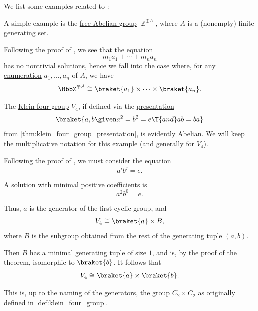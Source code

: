 \begin{example}\label{ex:thm:fundamental_theorem_of_finitely_generated_abelian_groups}
  We list some examples related to :
  \begin{thmenum}
     A simple example is the \hyperref[def:free_abelian_group]{free Abelian group} \( \BbbZ^{\oplus A} \), where \( A \) is a (nonempty) finite generating set.

    Following the proof of , we see that the equation
    \begin{equation*}
      m_1 a_1 + \cdots + m_n a_n
    \end{equation*}
    has no nontrivial solutions, hence we fall into the case where, for any \hyperref[def:set_enumeration]{enumeration} \( a_1, \ldots, a_n \) of \( A \), we have
    \begin{equation*}
      \BbbZ^{\oplus A} \cong \braket{ a_1 } \times \cdots \times \braket{ a_n }.
    \end{equation*}

     The \hyperref[def:klein_four_group]{Klein four group} \( V_4 \), if defined via the \hyperref[def:group_presentation]{presentation}
    \begin{equation*}
      \braket{ a, b \given a^2 = b^2 = e \T{and} ab = ba }
    \end{equation*}
    from \cref{thm:klein_four_group_presentation}, is evidently Abelian. We will keep the multiplicative notation for this example (and generally for \( V_4 \)).

    Following the proof of , we must consider the equation
    \begin{equation*}
      a^i b^j = e.
    \end{equation*}

    A solution with minimal positive coefficients is
    \begin{equation*}
      a^2 b^0 = e.
    \end{equation*}

    Thus, \( a \) is the generator of the first cyclic group, and
    \begin{equation*}
      V_4 \cong \braket{ a } \times B,
    \end{equation*}
    where \( B \) is the subgroup obtained from the rest of the generating tuple \( (a, b) \).

    Then \( B \) has a minimal generating tuple of size \( 1 \), and is, by the proof of the theorem, isomorphic to \( \braket{ b } \). It follows that
    \begin{equation*}
      V_4 \cong \braket{ a } \times \braket{ b }.
    \end{equation*}

    This is, up to the naming of the generators, the group \( C_2 \times C_2 \) as originally defined in \cref{def:klein_four_group}.
  \end{thmenum}
\end{example}
